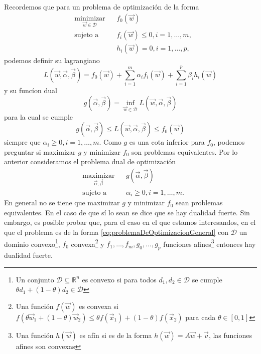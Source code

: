 \documentclass[letterpaper,12pt]{book}
\begin{document}
Recordemos que para un  problema de optimización de la forma 
\begin{equation}\label{eq:problemaDeOptimizacionGeneral}
  \begin{aligned}
    & \underset{\vec{w}\in\mathcal{D}}{\text{minimizar}}
    & & f_0(\vec{w})\\
    & \text{sujeto a}
    & & f_i(\vec{w}) \leq 0 , i = 1,\dots,m,\\
    & & & h_i(\vec{w}) = 0, i = 1, \dots, p,
  \end{aligned}
\end{equation}
podemos definir su lagrangiano 
\begin{equation}
  L(\vec{w}, \vec{\alpha}, \vec{\beta}) = f_0(\vec{w}) + \sum_{i=1}^{m}\alpha_if_i(\vec{w}) + \sum_{i=1}^{p}\beta_ih_i(\vec{w})
\end{equation}
y su funcíon dual 
\begin{equation}
  g(\vec{\alpha}, \vec{\beta}) = \inf_{\vec{w}\in\mathcal{D}}L(\vec{w}, \vec{\alpha}, \vec{\beta})
\end{equation}
para la cual se cumple
\begin{equation}
  g(\vec{\alpha}, \vec{\beta}) \leq L(\vec{w}, \vec{\alpha}, \vec{\beta}) \leq f_0(\vec{w})
\end{equation}
siempre que $\alpha_i\geq 0, i = 1,\dots, m$. Como $g$ es una cota inferior para $f_0$, podemos preguntar si maximizar $g$ y minimizar $f_0$ son problemas equivalentes. Por lo anterior consideramos el problema dual de optimización
\begin{equation}\label{eq:problemaOptimizacionDualGeneral}
  \begin{aligned}
    & \underset{\vec{\alpha},\vec{\beta}}{\text{maximizar}}
    & & g(\vec{\alpha}, \vec{\beta})\\
    & \text{sujeto a}
    & & \alpha_i \geq 0 , i = 1,\dots,m.
  \end{aligned}
\end{equation}
En general no se tiene que maximizar $g$ y minimizar $f_0$ sean problemas equivalentes. En el caso de que sí lo sean se dice que se hay dualidad fuerte. Sin embargo, es posible probar que, para el caso en el que estamos interesandos, en el que el problema es de la forma \ref{eq:problemaDeOptimizacionGeneral} con $\mathcal{D}$ un dominio convexo\footnote{Un conjunto $\mathcal{D} \subseteq \mathbb{R}^n$ es convexo si para todos $d_1, d_2\in\mathcal{D}$ se cumple $\theta d_1+(1-\theta)d_2\in\mathcal{D}$}, $f_0$ convexa\footnote{Una función $f(\vec{w})$ es convexa si $f(\theta\vec{w}_{1}+(1-\theta)\vec{w}_{2})\leq \theta f(\vec{x}_{1})+(1-\theta)f(\vec{x}_{2})$ para cada $\theta\in[0,1]$} y $f_1,\dots,f_m,g_0,\dots,g_p$ funciones afines\footnote{Una función $h(\vec{w})$ es afín si es de la forma $h(\vec{w}) = A\vec{w}+\vec{v}$, las funciones afines son convexas} entonces hay dualidad fuerte.
\end{document}
